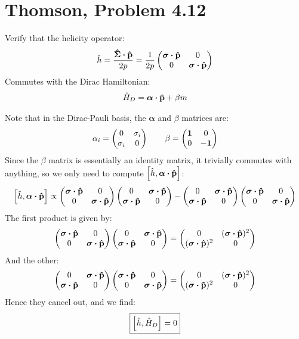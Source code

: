 \documentclass[12pt]{article}
\begin{document}
\section{Thomson, Problem 4.12}
\begin{problem}
  Verify that the helicity operator:
  \begin{align*}
    \hat{h}=\frac{\vu{\Sigma}\vdot\vu{p}}{2p}=\frac1{2p}\pmqty{\bm{\sigma}\vdot\vu{p}&0\\0&\bm{\sigma}\vdot\vu{p}}
  \end{align*}
  Commutes with the Dirac Hamiltonian:
  \begin{align*}
    \hat{H}_D=\bm{\alpha}\vdot\vu{p}+\beta m
  \end{align*}
\end{problem}
Note that in the Dirac-Pauli basis, the $\bm{\alpha}$ and $\beta$ matrices are:
\begin{align*}
  \alpha_i=\pmqty{0&\sigma_i\\\sigma_i&0}\qquad
  \beta=\pmqty{\bm{1}&0\\0&-\bm{1}}
\end{align*}
Since the $\beta$ matrix is essentially an identity matrix, it trivially commutes with anything, so we only need to compute $\comm{\hat{h}}{\bm{\alpha}\vdot\vu{p}}$:
\begin{align*}
  \comm{\hat{h}}{\bm{\alpha}\vdot\vu{p}}\propto
  \pmqty{\bm{\sigma}\vdot\vu{p}&0\\0&\bm{\sigma}\vdot\vu{p}}
  \pmqty{0&\bm{\sigma}\vdot\vu{p}\\\bm{\sigma}\vdot\vu{p}&0}-
  \pmqty{0&\bm{\sigma}\vdot\vu{p}\\\bm{\sigma}\vdot\vu{p}&0}
  \pmqty{\bm{\sigma}\vdot\vu{p}&0\\0&\bm{\sigma}\vdot\vu{p}}
\end{align*}
The first product is given by:
\begin{align*}
  \pmqty{\bm{\sigma}\vdot\vu{p}&0\\0&\bm{\sigma}\vdot\vu{p}}
  \pmqty{0&\bm{\sigma}\vdot\vu{p}\\\bm{\sigma}\vdot\vu{p}&0}
  =\pmqty{0&(\bm{\sigma}\vdot\vu{p})^2\\(\bm{\sigma}\vdot\vu{p})^2&0}
\end{align*}
And the other:
\begin{align*}
  \pmqty{0&\bm{\sigma}\vdot\vu{p}\\\bm{\sigma}\vdot\vu{p}&0}
  \pmqty{\bm{\sigma}\vdot\vu{p}&0\\0&\bm{\sigma}\vdot\vu{p}}
  =\pmqty{0&(\bm{\sigma}\vdot\vu{p})^2\\(\bm{\sigma}\vdot\vu{p})^2&0}
\end{align*}
Hence they cancel out, and we find:
\begin{equation}
  \label{eq:p5}
  \boxed{\comm{\hat{h}}{\hat{H}_D}=0}
\end{equation}
\newpage
\end{document}
